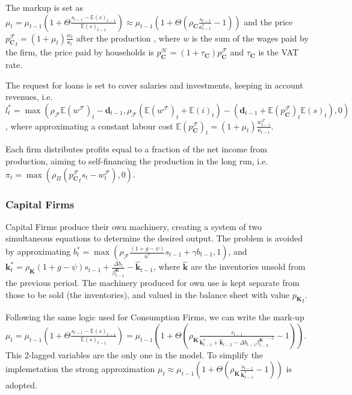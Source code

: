 \documentclass[a4paper, headings=standardclasses]{scrartcl}
\begin{document}
The markup is set as $\mu_t = \mu_{t-1}(1 + \Theta \frac{s_{t-1}-{\mathbb{E}(s)}_{t-1}}{{\mathbb{E}(s)}_{t-1}}) \approx \mu_{t-1}(1+\Theta(\rho_\mathbf{C}\frac{s_{t-1}}{\mathbf{c}^*_{t-1}}-1))$ and the price ${p^{\mathcal{F}}_\mathbf{C}}_t = (1+\mu_t)\frac{w_t}{\mathbf{c}_t}$ after the production \parencite[like in][]{caiani2016}, where $w$ is the sum of the wages paid by the firm, the price paid by households is $p^\mathcal{H}_\mathbf{C} = (1+\tau_\mathbf{C})p^\mathcal{F}_\mathbf{C}$ and $\tau_\mathbf{C}$ is the VAT rate.

The request for loans is set to cover salaries and investments, keeping in account revenues, i.e. $l_t^* = \max(\rho_\mathcal{F} \mathbb{E}(w^\mathcal{F})_t - \mathbf{d}_{t-1}, \rho_\mathcal{F} (\mathbb{E}(w^\mathcal{F})_t + \mathbb{E}(i)_t) - (\mathbf{d}_{t-1} + {\mathbb{E}(p^\mathcal{F}_{\mathbf{C}})}_t {\mathbb{E}(s)}_t), 0)$, where approximating a constant labour cost ${\mathbb{E}(p^\mathcal{F}_\mathbf{C})}_t = (1+\mu_t)\frac{w^\mathcal{F}_{t-1}}{\mathbf{c}_{t-1}}$.

Each firm distributes profits equal to a fraction of the net income from production, aiming to self-financing the production in the long run, i.e.  $\pi_t = \max(\rho_\Pi ({p^\mathcal{F}_\mathbf{C}}_t s_t - w^\mathcal{F}_t), 0)$.


\subsubsection{Capital Firms}
Capital Firms produce their own machinery, creating a system of two simultaneous equations to determine the desired output.
The problem is avoided by approximating $b^*_t = \max(\rho_\mathcal{F}\frac{(1+g-\psi)}{u^*}s_{t-1} + \gamma b_{t-1}, 1)$, and $\mathbf{k}_t^* = \rho_\mathbf{K}(1+g-\psi)s_{t-1} + \frac{{\Delta b}_t}{\beta^\mathbf{K}_{t-1}} - \hat{\mathbf{k}}_{t-1}$, where $\hat{\mathbf{k}}$ are the inventories unsold from the previous period. The machinery produced for own use is kept separate from those to be sold (the inventories), and valued in the balance sheet with value ${p_\mathbf{K}}_t$.

Following the same logic used for Consumption Firms, we can write the mark-up $\mu_t = \mu_{t-1}(1 + \Theta \frac{s_{t-1}-{\mathbb{E}(s)}_{t-1}}{{\mathbb{E}(s)}_{t-1}}) = \mu_{t-1}(1+\Theta(\rho_\mathbf{K}\frac{s_{t-1}}{\mathbf{k}^*_{t-1} + \hat{\mathbf{k}}_{t-2} - \Delta b_{t-1}{\beta^\mathbf{K}_{t-2}}^{-1}}-1))$.
This 2-lagged variables are the only one in the model. To simplify the implemetation the strong approximation $\mu_t \approx \mu_{t-1}(1+\Theta(\rho_\mathbf{K}\frac{s_{t-1}}{\mathbf{k}^*_{t-1}}-1))$ is adopted.
\end{document}
